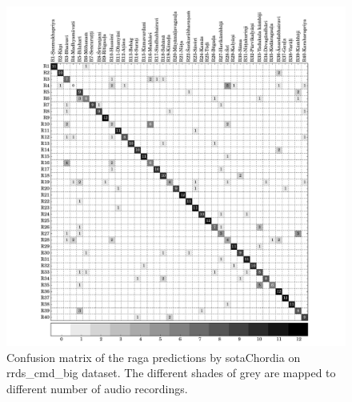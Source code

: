 \begin{figure}
	\begin{center}
		\includegraphics[width=\figSizeNinety]{ch07_ragaRecognition/figures/CM_pcd_cmd.pdf}
	\end{center}
	\caption[Confusion matrix of the classification results by \acrshort{sotaChordia} on \acrshort{rrds_cmd_big}]{Confusion matrix of the \gls{raga} predictions by \acrshort{sotaChordia} on \acrshort{rrds_cmd_big} dataset. The different shades of grey are mapped to different number of audio recordings.}
	\label{fig:confusion_matrix_cmd_chordia}
\end{figure}


